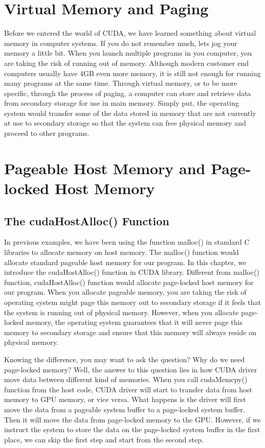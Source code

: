 \documentclass[letterpaper,10pt,english]{sphinxmanual}
\begin{document}
\section{Virtual Memory and Paging}
\label{Streams/Streams:virtual-memory-and-paging}
Before we entered the world of CUDA, we have learned something about virtual memory in computer systems. If you do not remember much, lets jog your memory a little bit. When you launch multiple programs in you computer, you are taking the risk of running out of memory. Although modern customer end computers usually have 4GB even more memory, it is still not enough for running many programs at the same time. Through virtual memory, or to be more specific, through the process of paging, a computer can store and retrieve data from secondary storage for use in main memory. Simply put, the operating system would transfer some of the data stored in memory that are not currently at use to secondary storage so that the system can free physical memory and proceed to other programs.


\section{Pageable Host Memory and Page-locked Host Memory}
\label{Streams/Streams:pageable-host-memory-and-page-locked-host-memory}

\subsection{The cudaHostAlloc() Function}
\label{Streams/Streams:the-cudahostalloc-function}
In previous examples, we have been using the function malloc() in standard C libraries to allocate memory on host memory. The malloc() function would allocate standard pageable host memory for our program. In this chapter, we introduce the cudaHostAlloc() function in CUDA library. Different from malloc() function, cudaHostAlloc() function would allocate page-locked host memory for our program. When you allocate pageable memory, you are taking the risk of operating system might page this memory out to secondary storage if it feels that the system is running out of physical memory. However, when you allocate page-locked memory, the operating system guarantees that it will never page this memory to secondary storage and ensure that this memory will always reside on physical memory.

Knowing the difference, you may want to ask the question? Why do we need page-locked memory? Well, the answer to this question lies in how CUDA driver move data between different kind of memories. When you call cudaMemcpy() function from the host code, CUDA driver will start to transfer data from host memory to GPU memory, or vice versa. What happens is the driver will first move the data from a pageable system buffer to a page-locked system buffer. Then it will move the data from page-locked memory to the GPU. However, if we instruct the system to store the data on the page-locked system buffer in the first place, we can skip the first step and start from the second step.
\end{document}
